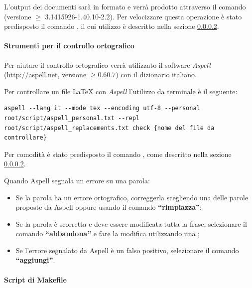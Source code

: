 		L'output dei documenti sarà in formato  e verrà prodotto attraverso il comando  (versione $\geq$ 3.1415926-1.40.10-2.2). Per velocizzare questa operazione è stato predisposto il comando , il cui utilizzo è descritto nella sezione \ref{makefile}.
		
		\paragraph{Strumenti per il controllo ortografico}
		
		Per aiutare il controllo ortografico verrà utilizzato il software \emph{Aspell} (\url{http://aspell.net}, versione $\geq 0.60.7$) con il dizionario italiano.
		
		Per controllare un file \LaTeX{} con \emph{Aspell} l'utilizzo da terminale è il seguente:
\begin{lstlisting}
aspell --lang it --mode tex --encoding utf-8 --personal root/script/aspell_personal.txt --repl root/script/aspell_replacements.txt check {nome del file da controllare}
\end{lstlisting}
		
		Per comodità è stato predisposto il comando , come descritto nella sezione \ref{makefile}.
		
		Quando Aspell segnala un errore su una parola:
		\begin{itemize}
		 \item Se la parola ha un errore ortografico, correggerla scegliendo una delle parole proposte da Aspell oppure usando il comando \textbf{``rimpiazza''};
		 \item Se la parola è scorretta e deve essere modificata tutta la frase, selezionare il comando \textbf{``abbandona''} e fare la modifica utilizzando una ;
		 \item Se l'errore segnalato da Aspell è un falso positivo, selezionare il comando \textbf{``aggiungi''}.
		\end{itemize}

		\paragraph{Script di Makefile}
		\label{makefile}

